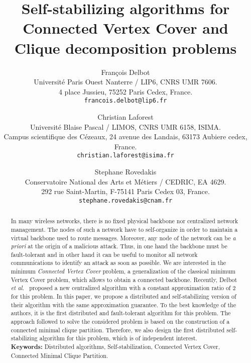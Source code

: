 \documentclass[11pt,letterpaper,onecolumn]{article}
\begin{document}
\title{Self-stabilizing algorithms for Connected Vertex Cover and Clique decomposition problems}

\author{Fran\c{c}ois Delbot\\
Universit\'{e} Paris Ouest Nanterre / LIP6, CNRS UMR 7606.\\4 place Jussieu, 75252 Paris Cedex, France.\\ \texttt{francois.delbot@lip6.fr}\\
\and Christian Laforest\\
Universit\'{e} Blaise Pascal / LIMOS, CNRS UMR 6158, ISIMA.\\Campus scientifique des C\'{e}zeaux, 24 avenue des Landais, 63173 Aubiere cedex, France.\\ \texttt{christian.laforest@isima.fr}\\
\and Stephane Rovedakis\\
Conservatoire National des Arts et M\'{e}tiers / CEDRIC, EA 4629.\\292 rue Saint-Martin, F-75141 Paris Cedex 03, France.\\ \texttt{stephane.rovedakis@cnam.fr}
}


\maketitle


\begin{abstract}
In many wireless networks, there is no fixed physical backbone nor centralized network management. The nodes of such a network have to self-organize in order to maintain a virtual backbone used to route messages. Moreover, any node of the network can be \textit{a priori} at the origin of a malicious attack. Thus, in one hand the backbone must be fault-tolerant and in other hand it can be useful to monitor all network communications to identify an attack as soon as possible. We are interested in the minimum \emph{Connected Vertex Cover} problem, a generalization of the classical minimum Vertex Cover problem, which allows to obtain a connected backbone. Recently, Delbot \emph{et al.}~\cite{DelbotLP13} proposed a new centralized algorithm with a constant approximation ratio of $2$ for this problem. In this paper, we propose a distributed and self-stabilizing version of their algorithm with the same approximation guarantee. To the best knowledge of the authors, it is the first distributed and fault-tolerant algorithm for this problem. The approach followed to solve the considered problem is based on the construction of a connected minimal clique partition. Therefore, we also design the first distributed self-stabilizing algorithm for this problem, which is of independent interest.\\

\textbf{Keywords:} Distributed algorithms, Self-stabilization, Connected Vertex Cover, Connected Minimal Clique Partition.
\end{abstract}
\end{document}
